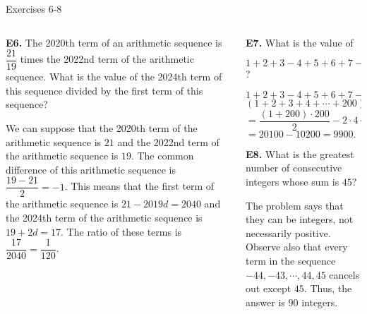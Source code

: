 \documentclass[9pt,aspectratio=169]{beamer}
\begin{document}
\begin{frame}{Exercises 6-8}
  \begin{columns}[T]
    \begin{column}{0.5\textwidth}
      \begin{problem}
        \textbf{E6.} The 2020th term of an arithmetic sequence is $\dfrac{21}
        {19}$ times the 2022nd term of the arithmetic sequence.
        What is the value of the 2024th term of this sequence divided by the first term of this sequence?
      \end{problem}
      We can suppose that the 2020th term of the arithmetic sequence is $21$ and the 2022nd term of the arithmetic sequence is $19$. The common difference of this arithmetic sequence is $\dfrac{19-21}{2} = -1$. This
      means that the first term of the arithmetic sequence is $21 - 2019d = 2040$ and the 2024th term of
      the arithmetic sequence is $19 + 2d = 17$. The ratio of these terms is $\dfrac{17}{2040} = \boxed{\dfrac{1}{120}}$.
    \end{column}
    \begin{column}{0.5\textwidth}
      \begin{problem}
        \textbf{E7.} What is the value of

        $1+2+3-4+5+6+7-8+\cdots+197+198+199-200$?
      \end{problem}
      $1+2+3-4+5+6+7-8+\cdots+197+198+199-200=$
      $(1 + 2 + 3 + 4 + \cdots + 200) - 2\cdot(4 + 8 + 12 + \cdots + 200) =$ $=\dfrac{(1 + 200)\cdot 200}{2} - 2 \cdot 4 \cdot \dfrac{(1 + 50)\cdot 50}{2} = $ 
      $= 20100 - 10200 = \boxed{9900}.$
      \begin{problem}
        \textbf{E8.} What is the greatest number of consecutive integers whose sum is $45$?
      \end{problem}
      The problem says that they can be integers, not necessarily positive. Observe also that every term in the sequence $-44, -43, \cdots, 44, 45$ cancels out except $45$. Thus, the answer is $\boxed{90}$ integers.
    \end{column}
  \end{columns}
\end{frame}
\end{document}
